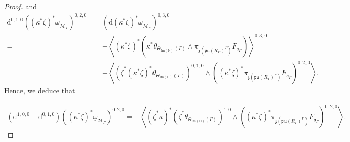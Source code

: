 \documentclass[10pt,a4paper]{amsart}
\newcommand{\m}[1]{{\mathrm{#1}}}
\begin{document}
\begin{proof}
and 
\begin{align*}
    \m{d}^{0,1,0}((\kappa^*\overline{\zeta})^*\underline{\omega}_{\mathcal{M}_\Gamma})^{0,2,0}=&(\m{d}(\kappa^*\overline{\zeta})^*\underline{\omega}_{\mathcal{M}_\Gamma})^{0,3,0}\\
    =&-\left<(\kappa^*\overline{\zeta})^*\left(\kappa^*\theta_{\Theta_{\m{Im}(\mathbb{H})}(\Gamma)}\wedge\pi_{\mathfrak{z}(\mathfrak{pu}(R_\Gamma)^{\Gamma})}F_{\mathfrak{a}_\Gamma}\right)\right>^{0,3,0}\\
    =&-\left<(\overline{\zeta}^*(\kappa^*\overline{\zeta})^*\theta_{\Theta_{\m{Im}(\mathbb{H})}(\Gamma)})^{0,1,0}\wedge((\kappa^*\overline{\zeta})^*\pi_{\mathfrak{z}(\mathfrak{pu}(R_\Gamma)^{\Gamma})}F_{\mathfrak{a}_\Gamma})^{0,2,0}\right>.
\end{align*}
Hence, we deduce that 

\begin{align*}
    (\m{d}^{1,0,0}+\m{d}^{0,1,0})((\kappa^*\overline{\zeta})^*\underline{\omega}_{\mathcal{M}_\Gamma})^{0,2,0}=&\left<(\overline{\zeta}^*\kappa)^*(\overline{\zeta}^*\theta_{\Theta_{\m{Im}(\mathbb{H})}(\Gamma)})^{1,0}\wedge((\kappa^*\overline{\zeta})^*\pi_{\mathfrak{z}(\mathfrak{pu}(R_\Gamma)^{\Gamma})}F_{\mathfrak{a}_\Gamma})^{0,2,0}\right>.
\end{align*}


\end{proof}
\end{document}
